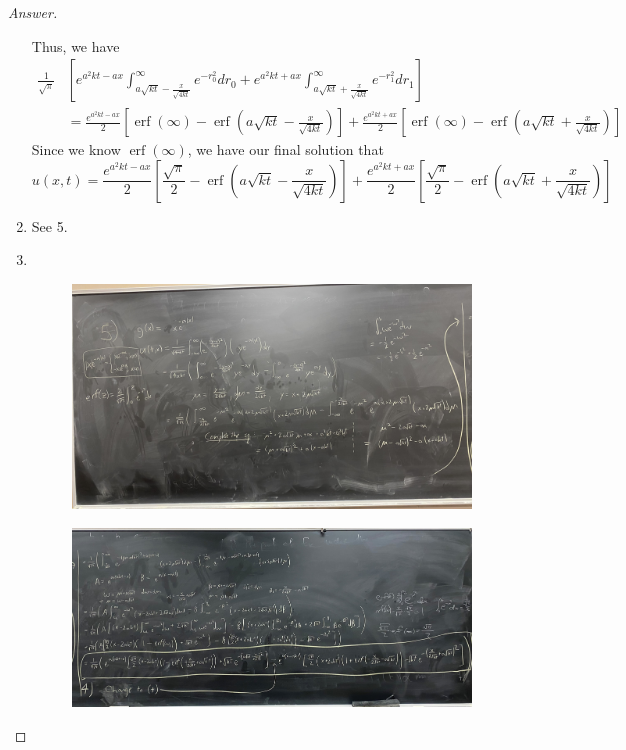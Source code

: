 \documentclass{article}
\theoremstyle{definition}
\renewcommand\qedsymbol{$\blacksquare$}
\newenvironment{ans}{\begin{proof}[Answer]\renewcommand{\qedsymbol}{}}{\end{proof}}
\DeclareMathOperator{\erf}{erf}
\begin{document}
\begin{ans}
\begin{enumerate}
    Thus, we have
    \begin{align*}
        \frac{1}{\sqrt{\pi}}&\left[ e^{a^2kt - ax}\int_{a\sqrt{kt} -\frac{x}{\sqrt{4kt}}}^\infty e^{-r_0^2}dr_0 + e^{a^2kt + ax}\int_{a\sqrt{kt} + \frac{x}{\sqrt{4kt}}} ^\infty e^{-r_1^2}dr_1\right]\\
        &= \frac{e^{a^2kt - ax}}{2}\left[ \erf(\infty) - \erf\left(a\sqrt{kt} -\frac{x}{\sqrt{4kt}}\right) \right] + \frac{e^{a^2kt + ax}}{2}\left[ \erf(\infty) - \erf\left(a\sqrt{kt} +\frac{x}{\sqrt{4kt}}\right) \right]
    \end{align*}
    Since we know $\erf(\infty)$, we have our final solution that
    \[\boxed{u(x,t) = \frac{e^{a^2kt - ax}}{2}\left[ \frac{\sqrt{\pi}}{2} - \erf\left(a\sqrt{kt} -\frac{x}{\sqrt{4kt}}\right) \right] + \frac{e^{a^2kt + ax}}{2}\left[ \frac{\sqrt{\pi}}{2} - \erf\left(a\sqrt{kt} +\frac{x}{\sqrt{4kt}}\right) \right]}\]
    
    \item See 5.
    
    \item \phantom{.}\\\begin{figure}[H]
        \centering
        \includegraphics[width=\textwidth]{Problem 1.4-5.jpg}
    \end{figure}
    \begin{figure}[H]
        \centering
        \includegraphics[width=\textwidth]{Problem 1.4-5 (2).jpg}
    \end{figure}
    \end{enumerate}
\end{ans}
\end{document}
